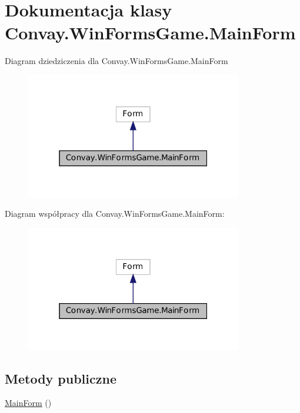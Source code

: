 \hypertarget{class_convay_1_1_win_forms_game_1_1_main_form}{}\section{Dokumentacja klasy Convay.\+Win\+Forms\+Game.\+Main\+Form}
\label{class_convay_1_1_win_forms_game_1_1_main_form}


Diagram dziedziczenia dla Convay.\+Win\+Forms\+Game.\+Main\+Form
\nopagebreak
\begin{figure}[H]
\begin{center}
\leavevmode
\includegraphics[width=268pt]{class_convay_1_1_win_forms_game_1_1_main_form__inherit__graph}
\end{center}
\end{figure}


Diagram współpracy dla Convay.\+Win\+Forms\+Game.\+Main\+Form\+:
\nopagebreak
\begin{figure}[H]
\begin{center}
\leavevmode
\includegraphics[width=268pt]{class_convay_1_1_win_forms_game_1_1_main_form__coll__graph}
\end{center}
\end{figure}
\subsection*{Metody publiczne}
\begin{DoxyCompactItemize}
\item 
\hyperlink{class_convay_1_1_win_forms_game_1_1_main_form_a777eb51af380321826a26ac3dacfcda0}{Main\+Form} ()
\end{DoxyCompactItemize}
